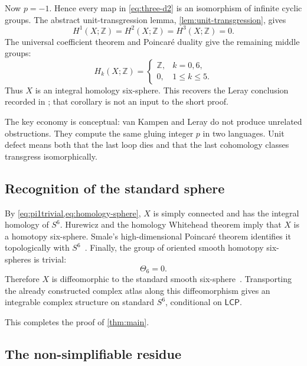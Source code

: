 \documentclass[11pt,reqno]{amsart}
\numberwithin{equation}{section}
\newcommand{\Z}{\mathbb Z}
\newcommand{\LCP}{\mathsf{LCP}}
\theoremstyle{definition}
\begin{document}
Now $p=-1$. Hence every map in \cref{eq:three-d2} is an isomorphism of infinite cyclic groups. The abstract unit-transgression lemma, \cref{lem:unit-transgression}, gives
\begin{equation}\label{eq:lowcohomology}
H^1(X;\Z)=H^2(X;\Z)=H^3(X;\Z)=0.
\end{equation}
The universal coefficient theorem and Poincar\'e duality give the remaining middle groups:
\begin{equation}\label{eq:homology-sphere}
H_k(X;\Z)=
\begin{cases}
\Z,&k=0,6,\\
0,&1\leq k\leq5.
\end{cases}
\end{equation}
Thus $X$ is an integral homology six-sphere. This recovers the Leray conclusion recorded in \cite[Cor.~7.29]{S6}; that corollary is not an input to the short proof.

The key economy is conceptual: van Kampen and Leray do not produce unrelated obstructions. They compute the same gluing integer $p$ in two languages. Unit defect means both that the last loop dies and that the last cohomology classes transgress isomorphically.

\subsection{Recognition of the standard sphere}

By \cref{eq:pi1trivial,eq:homology-sphere}, $X$ is simply connected and has the integral homology of $S^6$. Hurewicz and the homology Whitehead theorem imply that $X$ is a homotopy six-sphere. Smale's high-dimensional Poincar\'e theorem identifies it topologically with $S^6$~\cite{Smale}. Finally, the group of oriented smooth homotopy six-spheres is trivial:
\[
\Theta_6=0.
\]
Therefore $X$ is diffeomorphic to the standard smooth six-sphere~\cite{KM}. Transporting the already constructed complex atlas along this diffeomorphism gives an integrable complex structure on standard $S^6$, conditional on $\LCP$.

This completes the proof of \cref{thm:main}.

\subsection{The non-simplifiable residue}\label{sec:residue}
\end{document}

